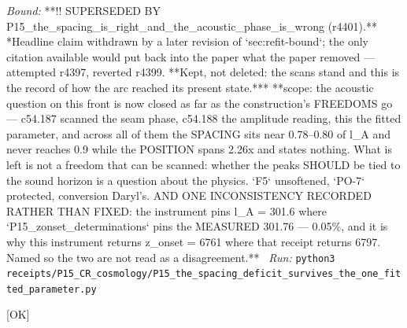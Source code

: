 \begin{description}
 \emph{Bound:} **!! SUPERSEDED BY P15\_the\_spacing\_is\_right\_and\_the\_acoustic\_phase\_is\_wrong (r4401).** *Headline claim withdrawn by a later revision of `sec:refit-bound`; the only citation available would put back into the paper what the paper removed --- attempted r4397, reverted r4399. **Kept, not deleted: the scans stand and this is the record of how the arc reached its present state.*** **scope: the acoustic question on this front is now closed as far as the construction's FREEDOMS go --- c54.187 scanned the seam phase, c54.188 the amplitude reading, this the fitted parameter, and across all of them the SPACING sits near 0.78--0.80 of l\_A and never reaches 0.9 while the POSITION spans 2.26x and states nothing. What is left is not a freedom that can be scanned: whether the peaks SHOULD be tied to the sound horizon is a question about the physics. `F5` unsoftened, `PO-7` protected, conversion Daryl's. AND ONE INCONSISTENCY RECORDED RATHER THAN FIXED: the instrument pins l\_A = 301.6 where `P15\_zonset\_determinations` pins the MEASURED 301.76 --- 0.05\%, and it is why this instrument returns z\_onset = 6761 where that receipt returns 6797. Named so the two are not read as a disagreement.**
\ \emph{Run:} \texttt{python3 receipts/P15\_CR\_cosmology/P15\_the\_spacing\_deficit\_survives\_the\_one\_fitted\_parameter.py}
\item[\label{rcpt:P15_the_spacing_is_right_and_the_acoustic_phase_is_wrong}\texttt{P15\_the\_spacing\_is\_right\_and\_the\_acoustic\_phase\_is\_wrong}]\hfill\textsf{[OK]}\\

\end{description}
